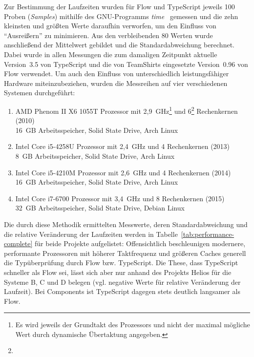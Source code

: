 Zur Bestimmung der Laufzeiten wurden für Flow und TypeScript jeweils 100 Proben (\textit{Samples}) mithilfe des GNU-Programms \textit{time}~\autocite{GNU_TIME} gemessen und die zehn kleinsten und größten Werte daraufhin verworfen, um den Einfluss von \enquote{Ausreißern} zu minimieren. Aus den verbleibenden 80 Werten wurde anschließend der Mittelwert gebildet und die Standardabweichung berechnet. Dabei wurde in allen Messungen die zum damaligen Zeitpunkt aktuelle Version~3.5 von TypeScript und die von TeamShirts eingesetzte Version~0.96 von Flow verwendet. Um auch den Einfluss von unterschiedlich leistungsfähiger Hardware miteinzubeziehen, wurden die Messreihen auf vier verschiedenen Systemen durchgeführt:

\begin{enumerate}[label=\Alph*.]
  \item AMD Phenom II X6 1055T Prozessor mit 2,9~GHz\footnote{Es wird jeweils der Grundtakt des Prozessors und nicht der maximal mögliche Wert durch dynamische Übertaktung angegeben.} und 6\footnote{} Rechenkernen (2010)\\16~GB Arbeitsspeicher, Solid State Drive, Arch Linux
  \item Intel Core i5-4258U Prozessor mit 2,4~GHz und 4 Rechenkernen (2013)\\8~GB Arbeitsspeicher, Solid State Drive, Arch Linux
  \item Intel Core i5-4210M Prozessor mit 2,6~GHz und 4 Rechenkernen (2014)\\16~GB Arbeitsspeicher, Solid State Drive, Arch Linux
  \item Intel Core i7-6700 Prozessor mit 3,4~GHz und 8 Rechenkernen (2015)\\32~GB Arbeitsspeicher, Solid State Drive, Debian Linux
\end{enumerate}

Die durch diese Methodik ermittelten Messwerte, deren Standardabweichung und die relative Veränderung der Laufzeiten werden in Tabelle~\ref{tab:performance-complete} für beide Projekte aufgelistet: Offensichtlich beschleunigen modernere, performante Prozessoren mit höherer Taktfrequenz und größeren Caches generell die Typüberprüfung durch Flow bzw. TypeScript. Die These, dass TypeScript schneller als Flow sei, lässt sich aber nur anhand des Projekts Helios für die Systeme B, C und D belegen (vgl. negative Werte für relative Veränderung der Laufzeit). Bei Components ist TypeScript dagegen stets deutlich langsamer als Flow.

\medbreak


